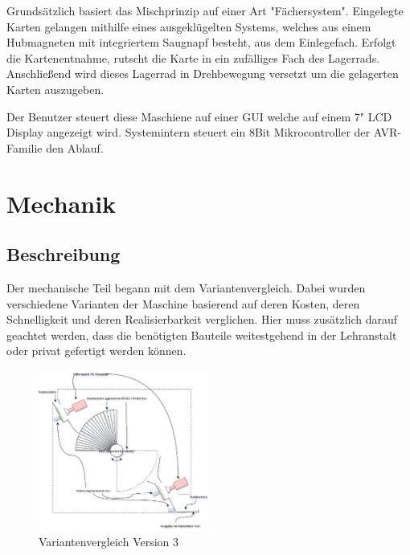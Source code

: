 Grundsätzlich basiert das Mischprinzip auf einer Art "Fächersystem".
Eingelegte Karten gelangen mithilfe eines ausgeklügelten Systems, welches aus einem Hubmagneten mit integriertem Saugnapf besteht, aus dem Einlegefach.
Erfolgt die Kartenentnahme, rutscht die Karte in ein zufälliges Fach des Lagerrads. Anschließend wird dieses Lagerrad in Drehbewegung versetzt um die gelagerten Karten auszugeben.

Der Benutzer steuert diese Maschiene auf einer GUI welche auf einem 7" LCD Display angezeigt wird. Systemintern steuert ein 8Bit Mikrocontroller der AVR-Familie den Ablauf.

\chapter{Mechanik}
\label{sec:Mechanik}
\section{Beschreibung}

Der mechanische Teil begann mit dem Variantenvergleich. Dabei wurden verschiedene Varianten der Maschine basierend auf deren Kosten, deren Schnelligkeit und deren Realisierbarkeit verglichen.
Hier muss zusätzlich darauf geachtet werden, dass die benötigten Bauteile weitestgehend in der Lehranstalt oder privat gefertigt werden können.\\

\begin{figure}
    \vspace{-50pt}
    \begin{center}
        \includegraphics[width=0.5\textwidth]{fig/Reshuffled_Version_3_0_prinzip}
    \end{center}
    \caption{Variantenvergleich Version 3}
    \label{Variantenvergleich}
    \vspace{-15pt}
\end{figure}

